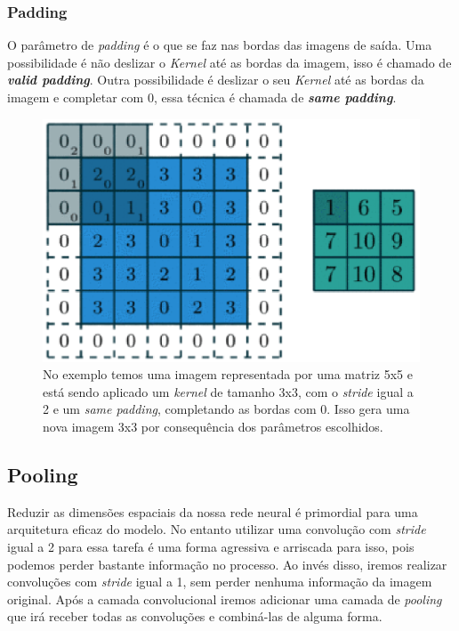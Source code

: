 \subsubsection{Padding}

O parâmetro de \textit{padding} é o que se faz nas bordas das imagens
de saída. Uma possibilidade é não deslizar o \textit{Kernel} até as
bordas da imagem, isso é chamado de {\bf \emph{valid padding}}. Outra
possibilidade é deslizar o seu \textit{Kernel} até as bordas da imagem
e completar com 0, essa técnica é chamada de {\bf \emph{same
    padding}}.

\begin{figure}[H]
\centering
\includegraphics[scale=0.6]{imagens/conv_kernel_pad_stride.eps}
\caption{No exemplo temos uma imagem representada por uma matriz 5x5 e
  está sendo aplicado um \textit{kernel} de tamanho 3x3, com o
  \textit{stride} igual a 2 e um \textit{same padding}, completando as
  bordas com 0. Isso gera uma nova imagem 3x3 por consequência dos
  parâmetros escolhidos.}
\label{fig:convolution_kernel}
\end{figure}

\subsection{Pooling}

Reduzir as dimensões espaciais da nossa rede neural é primordial para
uma arquitetura eficaz do modelo. No entanto utilizar uma convolução
com \textit{stride} igual a 2 para essa tarefa é uma forma agressiva e
arriscada para isso, pois podemos perder bastante informação no
processo. Ao invés disso, iremos realizar convoluções com
\textit{stride} igual a 1, sem perder nenhuma informação da imagem
original. Após a camada convolucional iremos adicionar uma camada de
\textit{pooling} que irá receber todas as convoluções e combiná-las de
alguma forma\cite{Dumoulin2016}.

